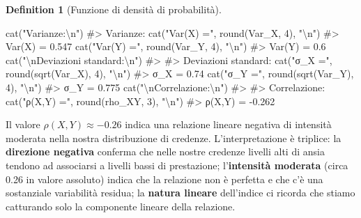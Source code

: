\documentclass[
  letterpaper,
  DIV=11,
  numbers=noendperiod,
  oneside]{scrreprt}
\newenvironment{Shaded}{\begin{snugshade}}{\end{snugshade}}
\newcommand{\CommentTok}[1]{\textcolor[rgb]{0.37,0.37,0.37}{#1}}
\newcommand{\DecValTok}[1]{\textcolor[rgb]{0.68,0.00,0.00}{#1}}
\newcommand{\FunctionTok}[1]{\textcolor[rgb]{0.28,0.35,0.67}{#1}}
\newcommand{\NormalTok}[1]{\textcolor[rgb]{0.00,0.23,0.31}{#1}}
\newcommand{\SpecialCharTok}[1]{\textcolor[rgb]{0.37,0.37,0.37}{#1}}
\newcommand{\StringTok}[1]{\textcolor[rgb]{0.13,0.47,0.30}{#1}}
\theoremstyle{definition}
\theoremstyle{plain}
\theoremstyle{definition}
\newtheorem{definition}{Definition}[chapter]
\theoremstyle{remark}
\begin{document}
\begin{definition}[Funzione di densità di
probabilità]
\begin{Shaded}
\begin{Highlighting}[]
\FunctionTok{cat}\NormalTok{(}\StringTok{"Varianze:}\SpecialCharTok{\textbackslash{}n}\StringTok{"}\NormalTok{)}
\CommentTok{\#\textgreater{} Varianze:}
\FunctionTok{cat}\NormalTok{(}\StringTok{"Var(X) ="}\NormalTok{, }\FunctionTok{round}\NormalTok{(Var\_X, }\DecValTok{4}\NormalTok{), }\StringTok{"}\SpecialCharTok{\textbackslash{}n}\StringTok{"}\NormalTok{)}
\CommentTok{\#\textgreater{} Var(X) = 0.547}
\FunctionTok{cat}\NormalTok{(}\StringTok{"Var(Y) ="}\NormalTok{, }\FunctionTok{round}\NormalTok{(Var\_Y, }\DecValTok{4}\NormalTok{), }\StringTok{"}\SpecialCharTok{\textbackslash{}n}\StringTok{"}\NormalTok{)}
\CommentTok{\#\textgreater{} Var(Y) = 0.6}
\FunctionTok{cat}\NormalTok{(}\StringTok{"}\SpecialCharTok{\textbackslash{}n}\StringTok{Deviazioni standard:}\SpecialCharTok{\textbackslash{}n}\StringTok{"}\NormalTok{)}
\CommentTok{\#\textgreater{} }
\CommentTok{\#\textgreater{} Deviazioni standard:}
\FunctionTok{cat}\NormalTok{(}\StringTok{"σ\_X ="}\NormalTok{, }\FunctionTok{round}\NormalTok{(}\FunctionTok{sqrt}\NormalTok{(Var\_X), }\DecValTok{4}\NormalTok{), }\StringTok{"}\SpecialCharTok{\textbackslash{}n}\StringTok{"}\NormalTok{)}
\CommentTok{\#\textgreater{} σ\_X = 0.74}
\FunctionTok{cat}\NormalTok{(}\StringTok{"σ\_Y ="}\NormalTok{, }\FunctionTok{round}\NormalTok{(}\FunctionTok{sqrt}\NormalTok{(Var\_Y), }\DecValTok{4}\NormalTok{), }\StringTok{"}\SpecialCharTok{\textbackslash{}n}\StringTok{"}\NormalTok{)}
\CommentTok{\#\textgreater{} σ\_Y = 0.775}
\FunctionTok{cat}\NormalTok{(}\StringTok{"}\SpecialCharTok{\textbackslash{}n}\StringTok{Correlazione:}\SpecialCharTok{\textbackslash{}n}\StringTok{"}\NormalTok{)}
\CommentTok{\#\textgreater{} }
\CommentTok{\#\textgreater{} Correlazione:}
\FunctionTok{cat}\NormalTok{(}\StringTok{"ρ(X,Y) ="}\NormalTok{, }\FunctionTok{round}\NormalTok{(rho\_XY, }\DecValTok{3}\NormalTok{), }\StringTok{"}\SpecialCharTok{\textbackslash{}n}\StringTok{"}\NormalTok{)}
\CommentTok{\#\textgreater{} ρ(X,Y) = {-}0.262}
\end{Highlighting}
\end{Shaded}

Il valore \(\rho(X,Y) \approx -0.26\) indica una relazione lineare
negativa di intensità moderata nella nostra distribuzione di credenze.
L'interpretazione è triplice: la \textbf{direzione negativa} conferma
che nelle nostre credenze livelli alti di ansia tendono ad associarsi a
livelli bassi di prestazione; l'\textbf{intensità moderata} (circa 0.26
in valore assoluto) indica che la relazione non è perfetta e che c'è una
sostanziale variabilità residua; la \textbf{natura lineare} dell'indice
ci ricorda che stiamo catturando solo la componente lineare della
relazione.


\end{definition}
\end{document}
